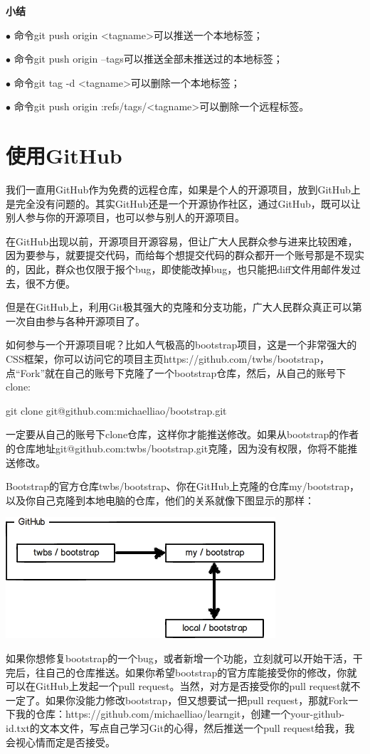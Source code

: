 \documentclass[•]{article}
\begin{document}
\begin{CJK}{UTF8}{gbsn}
\textbf{小结}

$\bullet$    命令git push origin <tagname>可以推送一个本地标签；

$\bullet$     命令git push origin --tags可以推送全部未推送过的本地标签；

 $\bullet$    命令git tag -d <tagname>可以删除一个本地标签；

   $\bullet$  命令git push origin :refs/tags/<tagname>可以删除一个远程标签。



\section{使用GitHub}
\qquad 我们一直用GitHub作为免费的远程仓库，如果是个人的开源项目，放到GitHub上是完全没有问题的。其实GitHub还是一个开源协作社区，通过GitHub，既可以让别人参与你的开源项目，也可以参与别人的开源项目。

\qquad 在GitHub出现以前，开源项目开源容易，但让广大人民群众参与进来比较困难，因为要参与，就要提交代码，而给每个想提交代码的群众都开一个账号那是不现实的，因此，群众也仅限于报个bug，即使能改掉bug，也只能把diff文件用邮件发过去，很不方便。

\qquad 但是在GitHub上，利用Git极其强大的克隆和分支功能，广大人民群众真正可以第一次自由参与各种开源项目了。

\qquad 如何参与一个开源项目呢？比如人气极高的bootstrap项目，这是一个非常强大的CSS框架，你可以访问它的项目主页https://github.com/twbs/bootstrap，点“Fork”就在自己的账号下克隆了一个bootstrap仓库，然后，从自己的账号下clone:

\begin{shaded}
git clone git@github.com:michaelliao/bootstrap.git
\end{shaded}

\qquad 一定要从自己的账号下clone仓库，这样你才能推送修改。如果从bootstrap的作者的仓库地址git@github.com:twbs/bootstrap.git克隆，因为没有权限，你将不能推送修改。

\qquad Bootstrap的官方仓库twbs/bootstrap、你在GitHub上克隆的仓库my/bootstrap，以及你自己克隆到本地电脑的仓库，他们的关系就像下图显示的那样：
\begin{center}
\includegraphics[scale=0.6]{github.png}
\end{center}
\qquad 如果你想修复bootstrap的一个bug，或者新增一个功能，立刻就可以开始干活，干完后，往自己的仓库推送。如果你希望bootstrap的官方库能接受你的修改，你就可以在GitHub上发起一个pull request。当然，对方是否接受你的pull request就不一定了。如果你没能力修改bootstrap，但又想要试一把pull request，那就Fork一下我的仓库：https://github.com/michaelliao/learngit，创建一个your-github-id.txt的文本文件，写点自己学习Git的心得，然后推送一个pull request给我，我会视心情而定是否接受。


\end{CJK}
\end{document}
